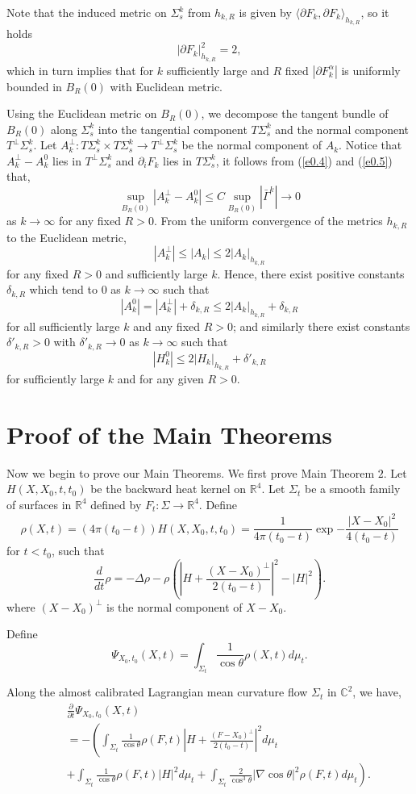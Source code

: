 Note that the induced metric on $\Sigma^k_s$ from $h_{k, R}$ is
given by $\langle\partial F_k, \partial F_k\rangle_{h_{k, R}}$, so
it holds
$$|\partial F_k|^2_{h_{k, R}}=2,
$$
which in turn implies that for $k$ sufficiently large and $R$
fixed $|\partial F^\alpha_k|$ is uniformly bounded in $B_R(0)$
with Euclidean metric.

Using the Euclidean metric on $B_R(0)$, we decompose the tangent
bundle of $B_R(0)$ along $\Sigma^k_s$ into the tangential
component $T\Sigma^k_s$ and the normal component
$T^\perp\Sigma^k_s$. Let $A^\perp_k: T\Sigma^k_s\times
T\Sigma^k_s\to T^\perp\Sigma^k_s$ be the normal component of
$A_k$. Notice that $A_k^\perp-A^0_k$ lies in $T^\perp\Sigma^k_s$
and $\partial_i F_k$ lies in $T\Sigma^k_s$, it follows from
(\ref{e0.4}) and (\ref{e0.5}) that,
$$\sup_{B_R(0)}|A_k^\perp-A_k^0|\leq
C\sup_{B_R(0)}|\bar\Gamma^k|\to 0
$$ as $k\to\infty$ for any fixed $R>0$. From the uniform
convergence of the metrics $h_{k, R}$ to the Euclidean metric,
$$|A_k^\perp|\leq |A_k|\leq 2|A_k|_{h_{k, R}}
$$ for any fixed $R>0$ and sufficiently large $k$. Hence, there
exist positive constants $\delta_{k, R}$ which tend to $0$ as
$k\to \infty$ such that
$$|A^0_k|=|A_k^\perp|+\delta_{k, R}\leq 2|A_k|_{h_{k,
R}}+\delta_{k, R}
$$ for all sufficiently large $k$ and any fixed $R>0$; and
similarly there exist constants $\delta'_{k, R}>0$ with
$\delta'_{k, R}\to 0$ as $k\to\infty $ such that
$$ |H^0_k|\leq 2|H_k|_{h_{k, R}}+\delta'_{k, R}
$$ for sufficiently large $k$ and for any given $R>0$.

\section{Proof of the Main Theorems}

Now we begin to prove our Main Theorems. We first prove Main
Theorem $2$. Let $H(X, X_0, t, t_0)$ be the backward heat kernel
on ${\mathbb{R}}^4$. Let $\Sigma_t$ be a smooth family of surfaces
in ${\mathbb{R}}^4$ defined by $F_t: \Sigma\to {\mathbb{R}}^4$.
Define
$$\rho(X,  t)=(4\pi (t_0-t))H(X, X_0, t, t_0)=\frac{1}{ 4\pi
(t_0-t)} \exp{-\frac{|X-X_0|^2}{4(t_0-t)}}
$$ for $t<t_0$, such that
$$\frac{d}{dt}\rho=-\Delta\rho-\rho\left(\left|H+\frac{(X-X_0)^\perp}{2(t_0-t)}
\right|^2-|H|^2\right).
$$ where $(X-X_0)^\perp$ is the normal component of $X-X_0$.

 Define
$$\Psi_{X_0, t_0}(X, t)=\int_{\Sigma_t}\frac{1}{\cos\theta}\rho(X, t)d\mu_t.
$$

\allowdisplaybreaks
\begin{proposition}\label{mono1}
Along the almost calibrated Lagrangian mean curvature flow
$\Sigma_t$ in ${\mathbb{C}}^2$, we have,
\begin{eqnarray*}
&&\frac{\partial}{\partial t}\Psi_{X_0, t_0}(X, t)\nonumber\\&&=
-\left( \int_{\Sigma_t}\frac{1}{\cos\theta}\rho (F, t)
\left|H+\frac{(F-X_0)^{\perp}}{2(t_0-t)}\right|^2d\mu_t \right.\nonumber \\
&&\left.+ \int_{\Sigma_t}\frac{1}{\cos\theta}\rho (F,
t)|H|^2d\mu_t +\int_{\Sigma_t}\frac{2}{\cos^3\theta}\left|\nabla
\cos\theta\right|^2\rho (F, t)d\mu_t\right).
\end{eqnarray*}
\end{proposition}

